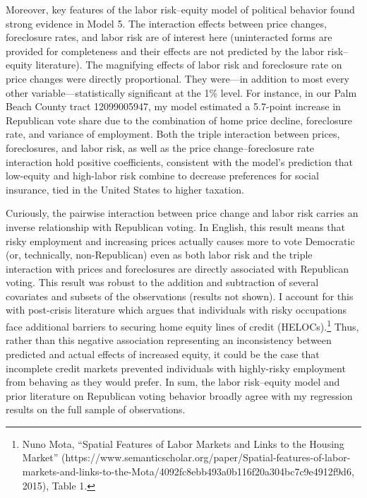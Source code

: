 \documentclass[12pt,oneside]{psthesis}
\begin{document}
Moreover, key features of the labor risk--equity model of political behavior found strong evidence in Model 5.
The interaction effects between price changes, foreclosure rates, and labor risk are of interest here (uninteracted forms are provided for completeness and their effects are not predicted by the labor risk--equity literature).
The magnifying effects of labor risk and foreclosure rate on price changes were directly proportional.
They were---in addition to most every other variable---statistically significant at the 1\% level.
For instance, in our Palm Beach County tract 12099005947, my model estimated a 5.7-point increase in Republican vote share due to the combination of home price decline, foreclosure rate, and variance of employment.
Both the triple interaction between prices, foreclosures, and labor risk, as well as the price change--foreclosure rate interaction hold positive coefficients, consistent with the model's prediction that low-equity and high-labor risk combine to decrease preferences for social insurance, tied in the United States to higher taxation.

Curiously, the pairwise interaction between price change and labor risk carries an inverse relationship with Republican voting.
In English, this result means that risky employment and increasing prices actually causes more to vote Democratic (or, technically, non-Republican) even as both labor risk and the triple interaction with prices and foreclosures are directly associated with Republican voting.
This result was robust to the addition and subtraction of several covariates and subsets of the observations (results not shown).
I account for this with post-crisis literature which argues that individuals with risky occupations face additional barriers to securing home equity lines of credit (HELOCs).\footnote{Nuno Mota, ``Spatial Features of Labor Markets and Links to the Housing Market'' (https://www.semanticscholar.org/paper/Spatial-features-of-labor-markets-and-links-to-the-Mota/4092fc8ebb493a0b116f20a304bc7c9e4912f9d6, 2015), Table 1.}
Thus, rather than this negative association representing an inconsistency between predicted and actual effects of increased equity, it could be the case that incomplete credit markets prevented individuals with highly-risky employment from behaving as they would prefer.
In sum, the labor risk--equity model and prior literature on Republican voting behavior broadly agree with my regression results on the full sample of observations.
\end{document}
